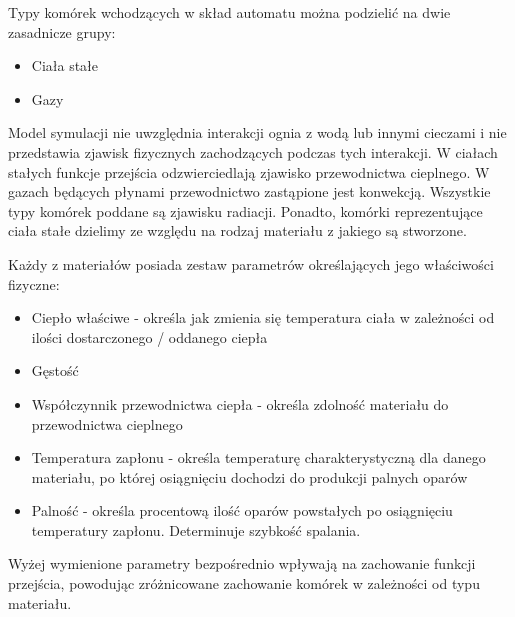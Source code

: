 Typy komórek wchodzących w skład automatu można podzielić na dwie zasadnicze grupy:
\begin{itemize}
\item Ciała stałe
\item Gazy
\end{itemize}
Model symulacji nie uwzględnia interakcji ognia z wodą lub innymi cieczami i nie przedstawia zjawisk fizycznych zachodzących podczas tych interakcji.
W ciałach stałych funkcje przejścia odzwierciedlają zjawisko przewodnictwa cieplnego. W gazach będących płynami przewodnictwo zastąpione jest konwekcją.
Wszystkie typy komórek poddane są zjawisku radiacji.
Ponadto, komórki reprezentujące ciała stałe dzielimy ze względu na rodzaj materiału z jakiego są stworzone.


Każdy z materiałów posiada zestaw parametrów określających jego właściwości fizyczne:
\begin{itemize}
\item Ciepło właściwe - określa jak zmienia się temperatura ciała w zależności od ilości dostarczonego / oddanego ciepła
\item Gęstość
\item Współczynnik przewodnictwa ciepła - określa zdolność materiału do przewodnictwa cieplnego
\item Temperatura zapłonu - określa temperaturę charakterystyczną dla danego materiału, po której osiągnięciu 
	dochodzi do produkcji palnych oparów
\item Palność - określa procentową ilość oparów powstałych po osiągnięciu temperatury zapłonu. Determinuje szybkość spalania.
\end{itemize}
Wyżej wymienione parametry bezpośrednio wpływają na zachowanie funkcji przejścia, powodując zróżnicowane zachowanie komórek w zależności od typu materiału.


